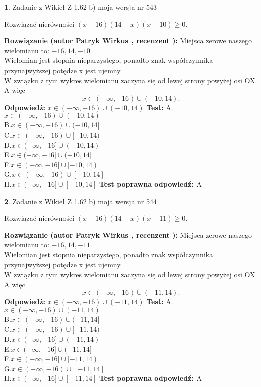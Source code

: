 \documentclass[12pt, a4paper]{article}
\theoremstyle{definition} %
\newtheorem{zad}{}
\newcommand{\zadStart}[1]{\begin{zad}#1\newline}
\newcommand{\zadStop}{\end{zad}}
\newcommand{\rozwStart}[2]{\noindent \textbf{Rozwiązanie (autor #1 , recenzent #2): }\newline}
\newcommand{\rozwStop}{\newline}
\newcommand{\odpStart}{\noindent \textbf{Odpowiedź:}\newline}
\newcommand{\odpStop}{\newline}
\newcommand{\testStart}{\noindent \textbf{Test:}\newline}
\newcommand{\testStop}{\newline}
\newcommand{\kluczStart}{\noindent \textbf{Test poprawna odpowiedź:}\newline}
\newcommand{\kluczStop}{\newline}
\begin{document}
\zadStart{Zadanie z Wikieł Z 1.62 b) moja wersja nr 543}

Rozwiązać nierówności $(x+16)(14-x)(x+10)\ge0$.
\zadStop
\rozwStart{Patryk Wirkus}{}
Miejsca zerowe naszego wielomianu to: $-16, 14, -10$.\\
Wielomian jest stopnia nieparzystego, ponadto znak współczynnika przy\linebreak najwyższej potędze x jest ujemny.\\ W związku z tym wykres wielomianu zaczyna się od lewej strony powyżej osi OX. A więc $$x \in (-\infty,-16) \cup (-10,14).$$
\rozwStop
\odpStart
$x \in (-\infty,-16) \cup (-10,14)$
\odpStop
\testStart
A.$x \in (-\infty,-16) \cup (-10,14)$\\
B.$x \in (-\infty,-16) \cup (-10,14]$\\
C.$x \in (-\infty,-16) \cup [-10,14)$\\
D.$x \in (-\infty,-16] \cup (-10,14)$\\
E.$x \in (-\infty,-16] \cup (-10,14]$\\
F.$x \in (-\infty,-16] \cup [-10,14)$\\
G.$x \in (-\infty,-16) \cup [-10,14]$\\
H.$x \in (-\infty,-16] \cup [-10,14]$
\testStop
\kluczStart
A
\kluczStop



\zadStart{Zadanie z Wikieł Z 1.62 b) moja wersja nr 544}

Rozwiązać nierówności $(x+16)(14-x)(x+11)\ge0$.
\zadStop
\rozwStart{Patryk Wirkus}{}
Miejsca zerowe naszego wielomianu to: $-16, 14, -11$.\\
Wielomian jest stopnia nieparzystego, ponadto znak współczynnika przy\linebreak najwyższej potędze x jest ujemny.\\ W związku z tym wykres wielomianu zaczyna się od lewej strony powyżej osi OX. A więc $$x \in (-\infty,-16) \cup (-11,14).$$
\rozwStop
\odpStart
$x \in (-\infty,-16) \cup (-11,14)$
\odpStop
\testStart
A.$x \in (-\infty,-16) \cup (-11,14)$\\
B.$x \in (-\infty,-16) \cup (-11,14]$\\
C.$x \in (-\infty,-16) \cup [-11,14)$\\
D.$x \in (-\infty,-16] \cup (-11,14)$\\
E.$x \in (-\infty,-16] \cup (-11,14]$\\
F.$x \in (-\infty,-16] \cup [-11,14)$\\
G.$x \in (-\infty,-16) \cup [-11,14]$\\
H.$x \in (-\infty,-16] \cup [-11,14]$
\testStop
\kluczStart
A
\kluczStop
\end{document}
